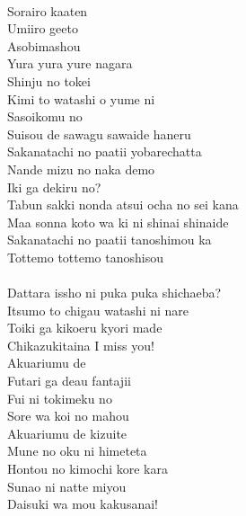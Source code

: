 \def\songtitle{Koi ni Naritai AQUARIUM}
\def\songcomment{Aqours Second Single}
\def\songlyrics{Aki Hata}
\def\songwriter{Yuugo Sasakura}
\def\songarrange{Kazunori Watanabe}
   
\ifdefined\COMPLETE
\else
	
	
\fi
\thispagestyle{song}

\begin{multicols}{2}\small
{}
\\
Sorairo kaaten \\
Umiiro geeto \\
Asobimashou\\

Yura yura yure nagara\\
Shinju no tokei\\
Kimi to watashi o yume ni\\
Sasoikomu no\\
Suisou de sawagu sawaide haneru\\
Sakanatachi no paatii yobarechatta\\

Nande mizu no naka demo\\
Iki ga dekiru no?\\
Tabun sakki nonda atsui ocha no sei kana\\
Maa sonna koto wa ki ni shinai shinaide\\
Sakanatachi no paatii tanoshimou ka\\

Tottemo tottemo tanoshisou\\
\\
Dattara issho ni puka puka shichaeba?\\
Itsumo to chigau watashi ni nare\\
Toiki ga kikoeru kyori made\\
Chikazukitaina I miss you!\\

Akuariumu de \\
Futari ga deau fantajii\\
Fui ni tokimeku no\\
Sore wa koi no mahou \\
Akuariumu de  kizuite\\
Mune no oku ni himeteta \\
Hontou no kimochi kore kara\\
Sunao ni natte miyou\\
Daisuki wa mou kakusanai! \\


\end{multicols}
